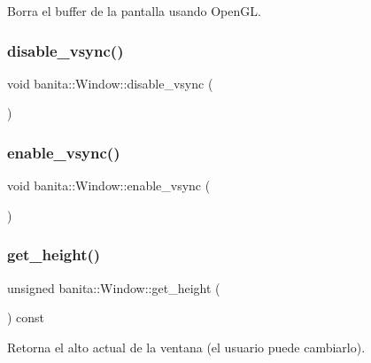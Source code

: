 Borra el buffer de la pantalla usando Open\+GL. \mbox{\label{classbanita_1_1_window_a1fe74bf9ef2333299983ee6198c13f91}} 
\subsubsection{\texorpdfstring{disable\_vsync()}{disable\_vsync()}}
{\footnotesize\ttfamily void banita\+::\+Window\+::disable\+\_\+vsync (\begin{DoxyParamCaption}{ }\end{DoxyParamCaption})}

\mbox{\label{classbanita_1_1_window_ace182aba92f36eeb05a63160b9f269f8}} 
\subsubsection{\texorpdfstring{enable\_vsync()}{enable\_vsync()}}
{\footnotesize\ttfamily void banita\+::\+Window\+::enable\+\_\+vsync (\begin{DoxyParamCaption}{ }\end{DoxyParamCaption})}

\mbox{\label{classbanita_1_1_window_a795dd72e44eb07310830aa516d4d9b99}} 
\subsubsection{\texorpdfstring{get\_height()}{get\_height()}}
{\footnotesize\ttfamily unsigned banita\+::\+Window\+::get\+\_\+height (\begin{DoxyParamCaption}{ }\end{DoxyParamCaption}) const}

Retorna el alto actual de la ventana (el usuario puede cambiarlo). \mbox{\label{classbanita_1_1_window_a5ff600fc2263ed812abbc9395d7a5dde}} 
